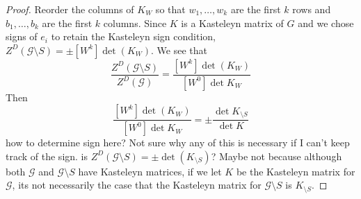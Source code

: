 \documentclass[11pt]{amsart}
\theoremstyle{definition}
\begin{document}
\begin{proof}
 Reorder the columns of $K_{W}$ so that $w_1, \ldots, w_k$ are the first $k$ rows and $b_1, \ldots, b_k$ are the first $k$ columns. Since $K$ is a Kasteleyn matrix of $G$ and we chose signs of $e_i$ to retain the Kasteleyn sign condition, $Z^{D}(\mathcal{G} \setminus S) = \pm [W^{k}] \det(K_{W})$. 
We see that
$$\dfrac{ Z^{D}(\mathcal{G} \setminus S)}{Z^{D}(\mathcal{G})} = \dfrac{ [W^{k}] \det(K_{W}) }{[W^{0}] \det K_{W}}$$
Then
$$ \dfrac{ [W^{k}] \det(K_{W}) }{[W^{0}] \det K_{W}} = \pm \dfrac{ \det K_{\setminus S} }{ \det K }$$
how to determine sign here?
Not sure why any of this is necessary if I can't keep track of the sign. 
is $Z^{D}(\mathcal{G} \setminus S) = \pm \det (K_{\setminus S})$? Maybe not because although both $\mathcal{G}$ and $\mathcal{G} \setminus S$ have Kasteleyn matrices, if we let $K$ be the Kasteleyn matrix for $\mathcal{G}$, its not necessarily the case that the Kasteleyn matrix for $\mathcal{G} \setminus S$ is $K_{\setminus S}$. 

\end{proof}
\end{document}
